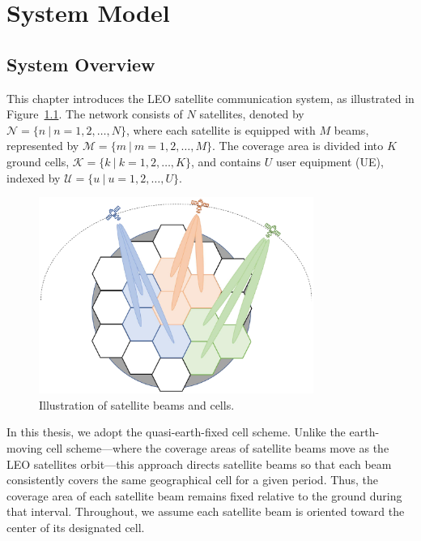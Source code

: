 \chapter{System Model}
\label{chap:model}
\section{System Overview}

This chapter introduces the LEO satellite communication system, as illustrated in Figure~\ref{fig_system}. The network consists of $N$ satellites, denoted by $\mathcal{N} = \{n\ |\ n = 1, 2, \ldots, N\}$, where each satellite is equipped with $M$ beams, represented by $\mathcal{M} = \{m\ |\ m = 1, 2, \ldots, M\}$. The coverage area is divided into $K$ ground cells, $\mathcal{K} = \{k\ |\ k = 1, 2, \ldots, K\}$, and contains $U$ user equipment (UE), indexed by $\mathcal{U} = \{u\ |\ u = 1, 2, \ldots, U\}$.

\begin{figure}[h!]
    \centering
    \includegraphics[width=0.8\textwidth]{figure/system overview.pdf}
    \caption{Illustration of satellite beams and cells.}
    \label{fig_system}
\end{figure}

In this thesis, we adopt the quasi-earth-fixed cell scheme. Unlike the earth-moving cell scheme—where the coverage areas of satellite beams move as the LEO satellites orbit—this approach directs satellite beams so that each beam consistently covers the same geographical cell for a given period. Thus, the coverage area of each satellite beam remains fixed relative to the ground during that interval. Throughout, we assume each satellite beam is oriented toward the center of its designated cell.

